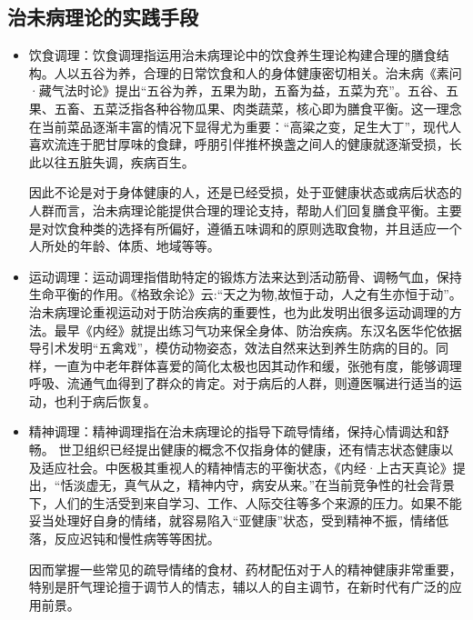 \subsection{治未病理论的实践手段}
\begin{itemize}
\item 饮食调理：饮食调理指运用治未病理论中的饮食养生理论构建合理的膳食结构。人以五谷为养，合理的日常饮食和人的身体健康密切相关。治未病《素问·藏气法时论》提出“五谷为养，五果为助，五畜为益，五菜为充”。五谷、五果、五畜、五菜泛指各种谷物瓜果、肉类蔬菜，核心即为膳食平衡。这一理念在当前菜品逐渐丰富的情况下显得尤为重要：“高粱之变，足生大丁”，现代人喜欢流连于肥甘厚味的食肆，呼朋引伴推杯换盏之间人的健康就逐渐受损，长此以往五脏失调，疾病百生。

因此不论是对于身体健康的人，还是已经受损，处于亚健康状态或病后状态的人群而言，治未病理论能提供合理的理论支持，帮助人们回复膳食平衡。主要是对饮食种类的选择有所偏好，遵循五味调和的原则选取食物，并且适应一个人所处的年龄、体质、地域等等。
\item 运动调理：运动调理指借助特定的锻炼方法来达到活动筋骨、调畅气血，保持生命平衡的作用。《格致余论》云:“天之为物,故恒于动，人之有生亦恒于动”。治未病理论重视运动对于防治疾病的重要性，也为此发明出很多运动调理的方法。最早《内经》就提出练习气功来保全身体、防治疾病。东汉名医华佗依据导引术发明“五禽戏”，模仿动物姿态，效法自然来达到养生防病的目的。同样，一直为中老年群体喜爱的简化太极也因其动作和缓，张弛有度，能够调理呼吸、流通气血得到了群众的肯定。对于病后的人群，则遵医嘱进行适当的运动，也利于病后恢复。

\item 精神调理：精神调理指在治未病理论的指导下疏导情绪，保持心情调达和舒畅。
世卫组织已经提出健康的概念不仅指身体的健康，还有情志状态健康以及适应社会。中医极其重视人的精神情志的平衡状态，《内经·上古天真论》提出，“恬淡虚无，真气从之，精神内守，病安从来。”在当前竞争性的社会背景下，人们的生活受到来自学习、工作、人际交往等多个来源的压力。如果不能妥当处理好自身的情绪，就容易陷入“亚健康”状态，受到精神不振，情绪低落，反应迟钝和慢性病等等困扰。

因而掌握一些常见的疏导情绪的食材、药材配伍对于人的精神健康非常重要，特别是肝气理论擅于调节人的情志，辅以人的自主调节，在新时代有广泛的应用前景。
\end{itemize}